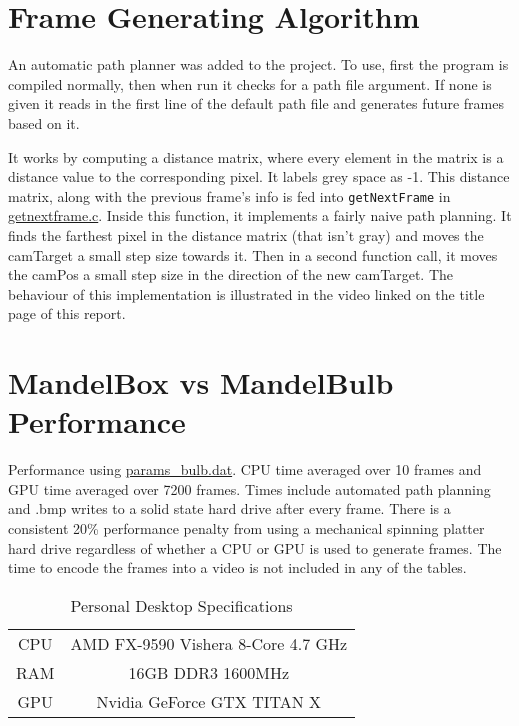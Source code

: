 \documentclass[]{article}
\begin{document}
\section{Frame Generating Algorithm}
An automatic path planner was added to the project. To use, first the program is compiled normally, then when run it checks for a path file argument. If none is given it reads in the first line of the default path file and generates future frames based on it. 

It works by computing a distance matrix, where every element in the matrix is a distance value to the corresponding pixel. It labels grey space as -1. This distance matrix, along with the previous frame's info is fed into \texttt{getNextFrame} in \hyperref[subsec:getnextframe.c]{getnextframe.c}. Inside this function, it implements a fairly naive path planning. It finds the farthest pixel in the distance matrix (that isn't gray) and moves the camTarget a small step size towards it. Then in a second function call, it moves the camPos a small step size in the direction of the new camTarget. The behaviour of this implementation is illustrated in the video linked on the title page of this report.

\section{MandelBox vs MandelBulb Performance }
Performance using \hyperref[subsec:params_bulb]{params\_bulb.dat}. CPU time averaged over 10 frames and GPU time averaged over 7200 frames. Times include automated path planning and .bmp writes to a solid state hard drive after every frame. There is a consistent 20\% performance penalty from using a mechanical spinning platter hard drive regardless of whether a CPU or GPU is used to generate frames. The time to encode the frames into a video is not included in any of the tables.

\vspace{0.125cm}
\begin{table}[h!]
\centering
\label{tab:dd_spec}
\begin{tabular}{c|c}
CPU & AMD FX-9590 Vishera 8-Core 4.7 GHz\\
RAM & 16GB DDR3 1600MHz\\
GPU & Nvidia GeForce GTX TITAN X\\
\end{tabular}
\caption{Personal Desktop Specifications}
\end{table}
\end{document}
